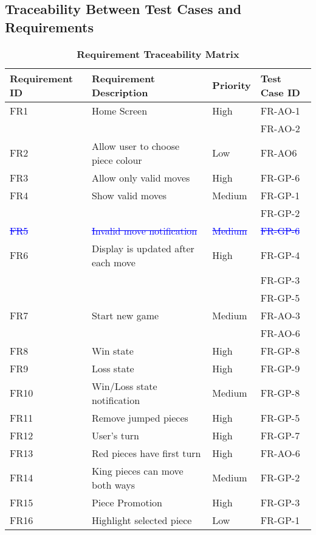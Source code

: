 \documentclass[12pt, titlepage]{article}
\begin{document}
\subsection{Traceability Between Test Cases and Requirements}
\newpage
\begin{table}[H]
    \begin{center}
	\caption{\bf Requirement Traceability Matrix}
	\begin{adjustwidth}{-1.5cm}{}
	\begin{tabularx}{1.2\textwidth}{|p{3.4cm}|p{7cm}|p{1.6cm}|X|}
		\hline 
		{\bf Requirement ID}  & {\bf Requirement Description} & {\bf Priority} & {\bf Test Case ID} \\
		\hline
		FR1 & Home Screen & High & FR-AO-1\\
		& & & FR-AO-2\\
		\hline
		FR2 & Allow user to choose piece colour & Low & FR-AO6\\
		\hline
		FR3 & Allow only valid moves & High & FR-GP-6\\
		\hline
		FR4 & Show valid moves & Medium & FR-GP-1\\
		& & & FR-GP-2\\
		\hline
		\textcolor{blue}{\sout{FR5}} & \textcolor{blue}{\sout{Invalid move notification}} & \textcolor{blue}{\sout{Medium }}& \textcolor{blue}{\sout{FR-GP-6}}\\
		\hline
		FR6 & Display is updated after each move & High & FR-GP-4\\
		& & & FR-GP-3\\
		& & & FR-GP-5\\
		\hline
		FR7 & Start new game & Medium & FR-AO-3\\
		& & & FR-AO-6\\
		\hline
		FR8 & Win state & High & FR-GP-8 \\
		\hline
		FR9 & Loss state & High & FR-GP-9 \\
		\hline
		FR10 & Win/Loss state notification & Medium & FR-GP-8 \\
		\hline
		FR11 & Remove jumped pieces & High & FR-GP-5\\
		\hline
		FR12 & User's turn & High & FR-GP-7\\
		\hline
		FR13 & Red pieces have first turn & High &  FR-AO-6\\
		\hline
		FR14 & King pieces can move both ways & Medium & FR-GP-2\\
		\hline
		FR15 & Piece Promotion & High & FR-GP-3\\
		\hline
		FR16 & Highlight selected piece & Low & FR-GP-1\\

\end{tabularx}
\end{adjustwidth}
\end{center}
\end{table}
\end{document}
